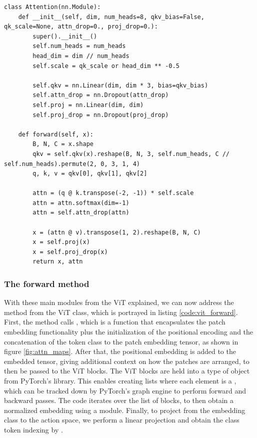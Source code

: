 \begin{lstlisting}[caption={Attention module for the ViT model}, label={code:attn_block}]
class Attention(nn.Module):
	def __init__(self, dim, num_heads=8, qkv_bias=False, qk_scale=None, attn_drop=0., proj_drop=0.):
		super().__init__()
		self.num_heads = num_heads
		head_dim = dim // num_heads
		self.scale = qk_scale or head_dim ** -0.5
		
		self.qkv = nn.Linear(dim, dim * 3, bias=qkv_bias)
		self.attn_drop = nn.Dropout(attn_drop)
		self.proj = nn.Linear(dim, dim)
		self.proj_drop = nn.Dropout(proj_drop)
	
	def forward(self, x):
		B, N, C = x.shape
		qkv = self.qkv(x).reshape(B, N, 3, self.num_heads, C // self.num_heads).permute(2, 0, 3, 1, 4)
		q, k, v = qkv[0], qkv[1], qkv[2]
		
		attn = (q @ k.transpose(-2, -1)) * self.scale
		attn = attn.softmax(dim=-1)
		attn = self.attn_drop(attn)
		
		x = (attn @ v).transpose(1, 2).reshape(B, N, C)
		x = self.proj(x)
		x = self.proj_drop(x)
		return x, attn
\end{lstlisting}

\subsubsection{The forward method}
With these main modules from the ViT explained, we can now address the  method from the ViT class, which is portrayed in listing \ref{code:vit_forward}. First, the  method calls , which is a function that encapsulates the patch embedding functionality plus the initialization of the positional encoding and the concatenation of the token class to the patch embedding tensor, as shown in figure \ref{fig:attn_maps}. After that, the positional embedding is added to the embedded tensor, giving additional context on how the patches are arranged, to then be passed to the ViT blocks. The ViT blocks are held into a  type of object from PyTorch's library. This enables creating lists where each element is a , which can be tracked down by PyTorch's graph engine to perform forward and backward passes. The code iterates over the list of blocks, to then obtain a normalized embedding using a  module. Finally, to project from the embedding class to the action space, we perform a linear projection and obtain the class token indexing by .

